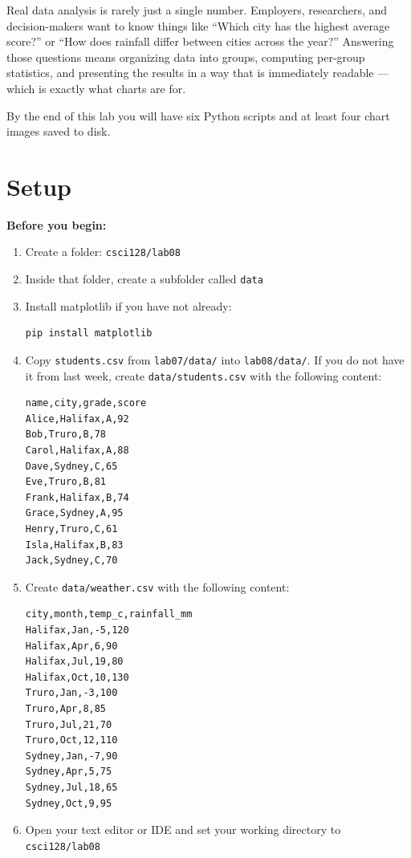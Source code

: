 \documentclass{cslab}
\begin{document}
Real data analysis is rarely just a single number. Employers, researchers, and decision-makers want to know things like ``Which city has the highest average score?'' or ``How does rainfall differ between cities across the year?'' Answering those questions means organizing data into groups, computing per-group statistics, and presenting the results in a way that is immediately readable --- which is exactly what charts are for.

By the end of this lab you will have six Python scripts and at least four chart images saved to disk.

\section{Setup}

\begin{setup}
\textbf{Before you begin:}
\begin{enumerate}
    \item Create a folder: \texttt{csci128/lab08}
    \item Inside that folder, create a subfolder called \texttt{data}
    \item Install matplotlib if you have not already:
\begin{verbatim}
pip install matplotlib
\end{verbatim}
    \item Copy \texttt{students.csv} from \texttt{lab07/data/} into \texttt{lab08/data/}.
          If you do not have it from last week, create \texttt{data/students.csv} with
          the following content:
\begin{verbatim}
name,city,grade,score
Alice,Halifax,A,92
Bob,Truro,B,78
Carol,Halifax,A,88
Dave,Sydney,C,65
Eve,Truro,B,81
Frank,Halifax,B,74
Grace,Sydney,A,95
Henry,Truro,C,61
Isla,Halifax,B,83
Jack,Sydney,C,70
\end{verbatim}
    \item Create \texttt{data/weather.csv} with the following content:
\begin{verbatim}
city,month,temp_c,rainfall_mm
Halifax,Jan,-5,120
Halifax,Apr,6,90
Halifax,Jul,19,80
Halifax,Oct,10,130
Truro,Jan,-3,100
Truro,Apr,8,85
Truro,Jul,21,70
Truro,Oct,12,110
Sydney,Jan,-7,90
Sydney,Apr,5,75
Sydney,Jul,18,65
Sydney,Oct,9,95
\end{verbatim}
    \item Open your text editor or IDE and set your working directory to \texttt{csci128/lab08}
\end{enumerate}
\end{setup}
\end{document}

